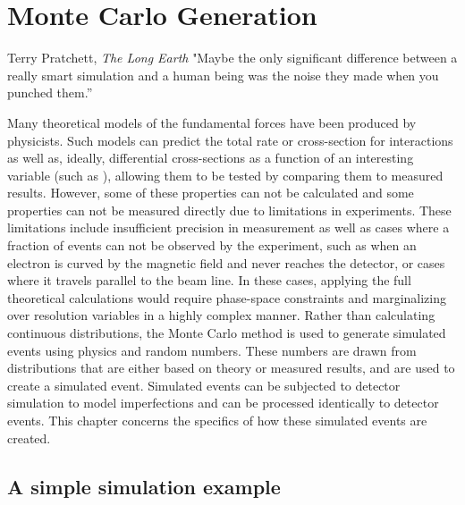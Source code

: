 \chapter{Monte Carlo Generation}
\label{Chapt:simulation_chapter}


\begin{chapquote}{Terry Pratchett, \textit{The Long Earth}}
"Maybe the only significant difference between a really smart simulation and a human being was the noise they made when you punched them.''
\end{chapquote}


Many theoretical models of the fundamental forces have been produced by physicists. Such models can predict the total rate or cross-section for interactions as well as, ideally, differential cross-sections as a  function of an interesting variable (such as \phistar), allowing them to be tested by comparing them to measured results.  However, some of these properties can not be calculated and some properties can not be measured directly due to limitations in experiments. These limitations include insufficient precision in measurement as well as cases where a fraction of events can not be observed by the experiment, such as when an electron is curved by the magnetic field and never reaches the detector, or cases where it travels parallel to the beam line. In these cases, applying the full theoretical calculations would require phase-space constraints and marginalizing over resolution variables in a highly complex manner.  Rather than calculating continuous distributions, the Monte Carlo method is used to generate simulated events using physics and random numbers. These numbers are drawn from distributions that are either based on theory or measured results, and are used to create a simulated event.  Simulated events can be subjected to detector simulation to model imperfections and can be processed identically to detector events. This chapter concerns the specifics of how these simulated events are created.
\section{A simple simulation example}


